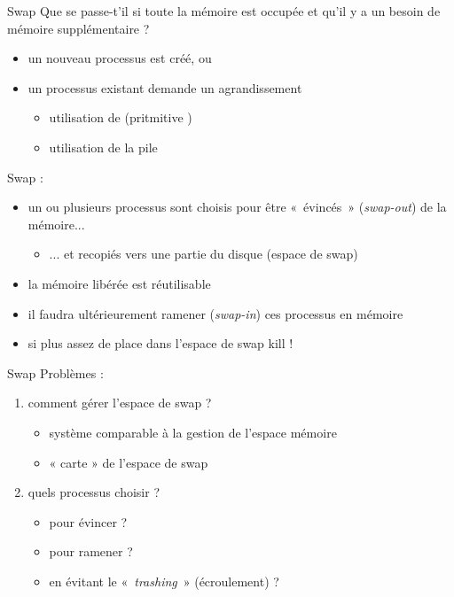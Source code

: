 \begin {frame} {Swap}
    Que se passe-t'il si toute la mémoire est occupée et qu'il y a un
    besoin de mémoire supplémentaire ?
    \begin {itemize}
	\item un nouveau processus est créé, ou
	\item un processus existant demande un agrandissement
	    \begin {itemize}
		\item utilisation de  (pritmitive )
		\item utilisation de la pile
	    \end {itemize}
    \end {itemize}

    \vspace* {3mm}
    
    Swap :

    \begin {itemize}
	\item un ou plusieurs processus sont choisis pour être
	    «~évincés~» (\textit {swap-out}) de la mémoire...

	    \begin {itemize}
		\item ... et recopiés vers une partie du disque
		    (espace de swap)
	    \end {itemize}

	\item la mémoire libérée est réutilisable

	\item il faudra ultérieurement ramener (\textit {swap-in})
	    ces processus en mémoire

	\item si plus assez de place dans l'espace de swap \implique kill !

    \end {itemize}
\end {frame}

\begin {frame} {Swap}
    Problèmes :
    \begin {enumerate}
	\item comment gérer l'espace de swap ?
	    \begin {itemize}
		\item système comparable à la gestion de l'espace mémoire
		\item \implique « carte » de l'espace de swap
	    \end {itemize}
	\item quels processus choisir ?
	    \begin {itemize}
		\item pour évincer ?
		\item pour ramener ?
		\item en évitant le «~\textit {trashing}~» (écroulement) ?
	    \end {itemize}
    \end {enumerate}
\end {frame}


